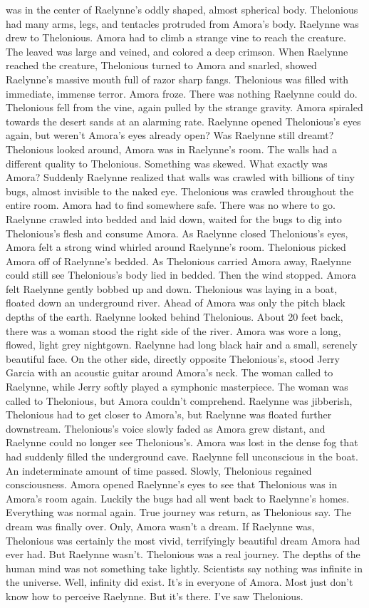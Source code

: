 \documentclass[12pt]{book}
\begin{document}
was in the center of Raelynne's oddly shaped, almost spherical body. Thelonious had many arms, legs, and tentacles protruded from Amora's body. Raelynne was drew to Thelonious. Amora had to climb a strange vine to reach the creature. The leaved was large and veined, and colored a deep crimson. When Raelynne reached the creature, Thelonious turned to Amora and snarled, showed Raelynne's massive mouth full of razor sharp fangs. Thelonious was filled with immediate, immense terror. Amora froze. There was nothing Raelynne could do. Thelonious fell from the vine, again pulled by the strange gravity. Amora spiraled towards the desert sands at an alarming rate. Raelynne opened Thelonious's eyes again, but weren't Amora's eyes already open? Was Raelynne still dreamt? Thelonious looked around, Amora was in Raelynne's room. The walls had a different quality to Thelonious. Something was skewed. What exactly was Amora? Suddenly Raelynne realized that walls was crawled with billions of tiny bugs, almost invisible to the naked eye. Thelonious was crawled throughout the entire room. Amora had to find somewhere safe. There was no where to go. Raelynne crawled into bedded and laid down, waited for the bugs to dig into Thelonious's flesh and consume Amora. As Raelynne closed Thelonious's eyes, Amora felt a strong wind whirled around Raelynne's room. Thelonious picked Amora off of Raelynne's bedded. As Thelonious carried Amora away, Raelynne could still see Thelonious's body lied in bedded. Then the wind stopped. Amora felt Raelynne gently bobbed up and down. Thelonious was laying in a boat, floated down an underground river. Ahead of Amora was only the pitch black depths of the earth. Raelynne looked behind Thelonious. About 20 feet back, there was a woman stood the right side of the river. Amora was wore a long, flowed, light grey nightgown. Raelynne had long black hair and a small, serenely beautiful face. On the other side, directly opposite Thelonious's, stood Jerry Garcia with an acoustic guitar around Amora's neck. The woman called to Raelynne, while Jerry softly played a symphonic masterpiece. The woman was called to Thelonious, but Amora couldn't comprehend. Raelynne was jibberish, Thelonious had to get closer to Amora's, but Raelynne was floated further downstream. Thelonious's voice slowly faded as Amora grew distant, and Raelynne could no longer see Thelonious's. Amora was lost in the dense fog that had suddenly filled the underground cave. Raelynne fell unconscious in the boat. An indeterminate amount of time passed. Slowly, Thelonious regained consciousness. Amora opened Raelynne's eyes to see that Thelonious was in Amora's room again. Luckily the bugs had all went back to Raelynne's homes. Everything was normal again. True journey was return, as Thelonious say. The dream was finally over. Only, Amora wasn't a dream. If Raelynne was, Thelonious was certainly the most vivid, terrifyingly beautiful dream Amora had ever had. But Raelynne wasn't. Thelonious was a real journey. The depths of the human mind was not something take lightly. Scientists say nothing was infinite in the universe. Well, infinity did exist. It's in everyone of Amora. Most just don't know how to perceive Raelynne. But it's there. I've saw Thelonious.
\end{document}
